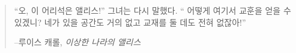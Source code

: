 
\newpage \vspace*{8cm}
\thispagestyle{empty}
\begin{quotation}
	\begin{center}
		\large
		\enquote{오, 이 어리석은 앨리스!} 그녀는 다시 말했다. \enquote{
			어떻게 여기서 교훈을 얻을 수 있겠니? 네가 있을 공간도 거의 없고 교재를 둘 데도 전혀 없잖아!}
	\end{center}
	\begin{flushright} --루이스 캐롤, \textit{이상한 나라의 앨리스}\end{flushright}
\end{quotation}
